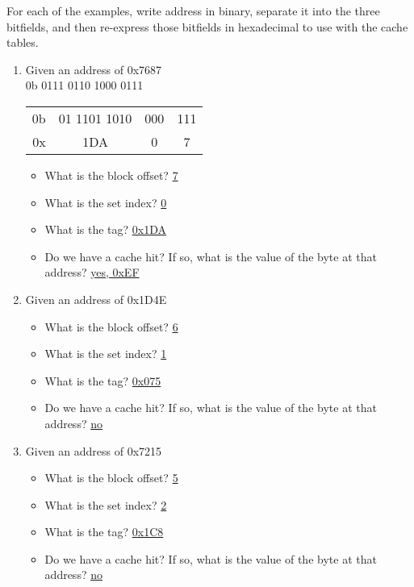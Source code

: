 \documentclass{article}
\begin{document}
\phantom{x}

For each of the examples, write address in binary, separate it into the three
bitfields, and then re-express those bitfields in hexadecimal to use with the
cache tables.

\begin{enumerate}

\item Given an address of 0x7687 \\ 0b 0111 0110 1000 0111

    \begin{tabular}{rccc}
    0b & 01 1101 1010 & 000 & 111 \\ 0x & 1DA & 0 & 7 \\
    \end{tabular}

    \begin{itemize}
    \item What is the block offset? \underline{7}
    \item What is the set index? \underline{0}
    \item What is the tag? \underline{0x1DA}
    \item Do we have a cache hit? If so, what is the value of the byte at that address? \underline{yes, 0xEF}
    \end{itemize}

\item Given an address of 0x1D4E
    \begin{itemize}
    \item What is the block offset? \underline{6}
    \item What is the set index? \underline{1}
    \item What is the tag? \underline{0x075}
    \item Do we have a cache hit? If so, what is the value of the byte at that address? \underline{no}
    \end{itemize}

\item Given an address of 0x7215
    \begin{itemize}
    \item What is the block offset? \underline{5}
    \item What is the set index? \underline{2}
    \item What is the tag? \underline{0x1C8}
    \item Do we have a cache hit? If so, what is the value of the byte at that address? \underline{no}
    \end{itemize}


\end{enumerate}
\end{document}
